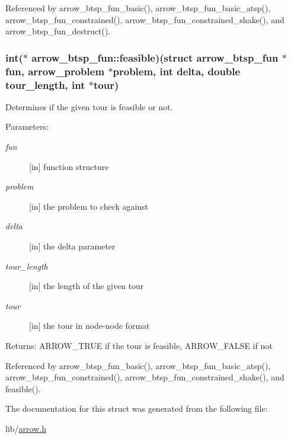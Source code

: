 Referenced by arrow\_\-btsp\_\-fun\_\-basic(), arrow\_\-btsp\_\-fun\_\-basic\_\-atsp(), arrow\_\-btsp\_\-fun\_\-constrained(), arrow\_\-btsp\_\-fun\_\-constrained\_\-shake(), and arrow\_\-btsp\_\-fun\_\-destruct().\hypertarget{structarrow__btsp__fun_a64a29d588b40b0d04db43e23a22d1a9}{
\subsubsection{\setlength{\rightskip}{0pt plus 5cm}int($\ast$ {\bf arrow\_\-btsp\_\-fun::feasible})(struct {\bf arrow\_\-btsp\_\-fun} $\ast$fun, {\bf arrow\_\-problem} $\ast$problem, int delta, double tour\_\-length, int $\ast$tour)}}
\label{structarrow__btsp__fun_a64a29d588b40b0d04db43e23a22d1a9}


Determines if the given tour is feasible or not. 

\begin{Desc}
\item[Parameters:]
\begin{description}
\item[{\em fun}]\mbox{[}in\mbox{]} function structure \item[{\em problem}]\mbox{[}in\mbox{]} the problem to check against \item[{\em delta}]\mbox{[}in\mbox{]} the delta parameter \item[{\em tour\_\-length}]\mbox{[}in\mbox{]} the length of the given tour \item[{\em tour}]\mbox{[}in\mbox{]} the tour in node-node format \end{description}
\end{Desc}
\begin{Desc}
\item[Returns:]ARROW\_\-TRUE if the tour is feasible, ARROW\_\-FALSE if not \end{Desc}


Referenced by arrow\_\-btsp\_\-fun\_\-basic(), arrow\_\-btsp\_\-fun\_\-basic\_\-atsp(), arrow\_\-btsp\_\-fun\_\-constrained(), arrow\_\-btsp\_\-fun\_\-constrained\_\-shake(), and feasible().

The documentation for this struct was generated from the following file:\begin{CompactItemize}
\item 
lib/\hyperlink{arrow_8h}{arrow.h}\end{CompactItemize}
